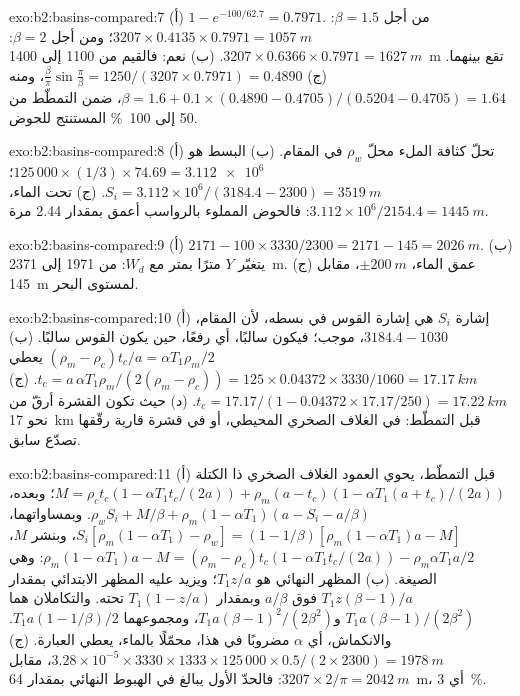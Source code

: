 \begin{solution}{exo:b2:basins-compared:7}
(أ) $1 - e^{-100/62.7} = 0.7971$. من أجل $\beta = 1.5$: $3207\times0.4135\times0.7971 =
\qty{1057}{m}$؛ ومن أجل $\beta = 2$: $3207\times0.6366\times0.7971 = \qty{1627}{m}$. (ب) نعم: فالقيم من 1100 إلى
\qty{1400}{m} تقع بينهما. (ج) $\frac{\beta}{\pi}\sin\frac{\pi}{\beta} = 1250/(3207\times0.7971)
= 0.4890$، ومنه $\beta = 1.6 + 0.1\times(0.4890 - 0.4705)/(0.5204 - 0.4705) = 1.64$، ضمن
التمطّط من 50 إلى \qty{100}{\percent} المستنتج للحوض.
\end{solution}

\begin{solution}{exo:b2:basins-compared:8}
(أ) تحلّ كثافة الملء محلّ $\rho_w$ في المقام. (ب) البسط هو
$125\,000\times(1/3)\times74.69 = \num{3.112e6}$؛ $S_i = 3.112\times10^{6}/(3184.4 - 2300) =
\qty{3519}{m}$. (ج) تحت الماء، $3.112\times10^{6}/2154.4 = \qty{1445}{m}$: فالحوض المملوء بالرواسب
أعمق بمقدار 2.44 مرة.
\end{solution}

\begin{solution}{exo:b2:basins-compared:9}
(أ) $2171 - 100\times3330/2300 = 2171 - 145 = \qty{2026}{m}$. (ب) يتغيّر $Y$ مترًا بمتر
مع $W_d$: من 1971 إلى \qty{2371}{m}. (ج) عمق الماء، $\pm\qty{200}{m}$، مقابل
\qty{145}{m} لمستوى البحر.
\end{solution}

\begin{solution}{exo:b2:basins-compared:10}
(أ) إشارة $S_i$ هي إشارة القوس في بسطه، لأن المقام، $3184.4 - 1030$،
موجب؛ فيكون سالبًا، أي رفعًا، حين يكون القوس سالبًا. (ب) $(\rho_m - \rho_c)t_c/a =
\alpha T_1\rho_m/2$ يعطي $t_c = a\,\alpha T_1\rho_m/(2(\rho_m - \rho_c)) = 125\times0.04372\times
3330/1060 = \qty{17.17}{km}$. (ج) $t_c = 17.17/(1 - 0.04372\times17.17/250) = \qty{17.22}{km}$.
(د) حيث تكون القشرة أرقّ من نحو \qty{17}{km} قبل التمطّط: في الغلاف الصخري المحيطي،
أو في قشرة قارية رقّقها تصدّع سابق.
\end{solution}

\begin{solution}{exo:b2:basins-compared:11}
(أ) قبل التمطّط، يحوي العمود الغلاف الصخري ذا الكتلة $M = \rho_c t_c(1 - \alpha T_1
t_c/(2a)) + \rho_m(a - t_c)(1 - \alpha T_1(a + t_c)/(2a))$؛ وبعده، $\rho_w S_i + M/\beta +
\rho_m(1 - \alpha T_1)(a - S_i - a/\beta)$. وبمساواتهما، $S_i[\rho_m(1 - \alpha T_1) - \rho_w] =
(1 - 1/\beta)[\rho_m(1 - \alpha T_1)a - M]$، وبنشر $M$، $\rho_m(1 - \alpha T_1)a - M =
(\rho_m - \rho_c)t_c(1 - \alpha T_1 t_c/(2a)) - \rho_m\alpha T_1 a/2$: وهي الصيغة. (ب) المظهر النهائي هو $T_1 z/a$؛ ويزيد عليه المظهر الابتدائي
بمقدار $T_1 z(\beta - 1)/a$ فوق $a/\beta$ وبمقدار $T_1(1 - z/a)$ تحته. والتكاملان هما $T_1
a(\beta - 1)/(2\beta^2)$ و$T_1 a(\beta - 1)^2/(2\beta^2)$، ومجموعهما $T_1 a(1 - 1/\beta)/2$.
والانكماش، أي $\alpha$ مضروبًا في هذا، محمّلًا بالماء، يعطي العبارة. (ج) $3.28\times10^{-5}
\times3330\times1333\times125\,000\times0.5/(2\times2300) = \qty{1978}{m}$، مقابل $3207\times
2/\pi = \qty{2042}{m}$: فالحدّ الأول يبالغ في الهبوط النهائي بمقدار \qty{64}{m}، أي
\qty{3}{\percent}.
\end{solution}

